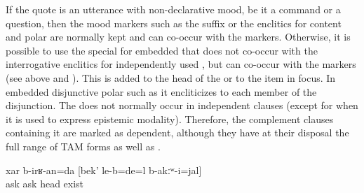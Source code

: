 If the quote is an utterance with non-declarative mood, be it a command or a question, then the mood markers such as the  suffix  or the enclitics for content   and polar   are normally kept and can co-occur with the  markers. Otherwise, it is possible to use the special  for embedded  that does not co-occur with the interrogative enclitics for independently used , but can co-occur with the  markers (see  above and ). This  is added to the head of the  or to the item in focus. In embedded disjunctive polar  such as  it encliticizes to each member of the disjunction. The  does not normally occur in independent clauses (except for when it is used to express epistemic modality). Therefore, the complement clauses containing it are marked as dependent, although they have at their disposal the full range of TAM forms as well as .
%
\begin{exe}
	\ex	\label{ex:‎‎‎There we will ask if he had a head or not}
	\gll	xar	b-irʁ-an=da	[bek'	le-b=de=l	b-akːʷ-i=jal]\\
		ask	ask	head	exist	\\
	\glt	{}
\end{exe}

